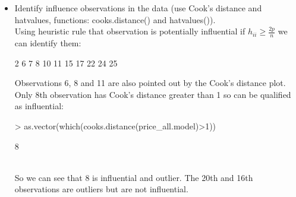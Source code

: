 \documentclass[a4paper]{article}
\begin{document}
\begin{itemize}
\item Identify influence observations in the data (use Cook's distance and
hatvalues, functions: cooks.distance() and hatvalues()).
\\

Using heuristic rule that observation is potentially influential if $h_{ii}\geq
\frac{2p}{n}$ we can identify them:
\begin{Schunk}
\begin{Soutput}
 [1]  2  6  7  8 10 11 15 17 22 24 25
\end{Soutput}
\end{Schunk}
Observations 6, 8 and 11 are also pointed out by the Cook's distance plot.\\
Only 8th observation has Cook's distance greater than 1 so can be qualified as
influential:
\begin{Schunk}
\begin{Sinput}
> as.vector(which(cooks.distance(price_all.model)>1))
\end{Sinput}
\begin{Soutput}
[1] 8
\end{Soutput}
\end{Schunk}
\\

So we can see that 8 is influential and outlier. The 20th and 16th observations
are outliers but are not influential.
\end{itemize}
\end{document}
